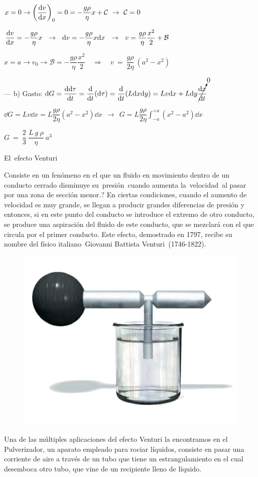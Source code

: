 $\displaystyle x=0 \to \left( \dv{v}{x} \right)_0=0 = -\dfrac{g\rho}{\eta} x + \mathcal C \ \to \  \mathcal C=0$

$\displaystyle \dv{v}{x}=-\dfrac{g\rho}{\eta} x \ \ \to \ \ \dd v = -\dfrac{g\rho}{\eta} x \dd x \ \ \to \ \ v=\dfrac{g \rho }{\eta}\dfrac{x^2}{2} +\mathcal B$

$x=a \to v_0 \to \mathcal B=-\dfrac{g \rho }{\eta}\dfrac{x^2}{2} \quad \Rightarrow \quad v\ =\ \dfrac{g\rho}{2\eta} \ (a^2-x^2)$

--- b) Gasto:  $\dd G=\displaystyle \dv{\dd \tau}{t}=\dv{t} (\dd \tau) = \dv{t} (L\dd x \dd y)=Lv\dd x + L \dd y \cancelto{0}{\dv{x}{t}}$

$\displaystyle \dd G= L v \dd x =L \dfrac{g\rho}{2\eta} (a^2-x^2) \dd x\ \ \to \ \ G=L \dfrac{g\rho}{2\eta} \int_{-a}^{+a} (x^2-a^2) \dd x$

$G\ =\ \dfrac 2 3 \ \dfrac{L \ g \ \rho}{\eta} \ a^3$
\newpage
\begin{myblock}{El efecto Venturi}

Consiste en un fenómeno en el que un fluido en movimiento dentro de un conducto cerrado disminuye su presión cuando aumenta la velocidad al pasar por una zona de sección menor.? En ciertas condiciones, cuando el aumento de velocidad es muy grande, se llegan a producir grandes diferencias de presión y entonces, si en este punto del conducto se introduce el extremo de otro conducto, se produce una aspiración del fluido de este conducto, que se mezclará con el que circula por el primer conducto. Este efecto, demostrado en 1797, recibe su nombre del físico italiano Giovanni Battista Venturi (1746-1822).

\begin{figure}[H]
	\centering
	\includegraphics[width=.75\textwidth]{imagenes/imagenes18/T18IM10.png}
	\end{figure}

Una de las múltiples aplicaciones  del efecto Venturi la encontramos en el Pulverizador, un aparato empleado para rociar líquidos, consiste en pasar una corriente de aire a través de un tubo que tiene un estrangulamiento en el cual desemboca otro tubo, que vine de un recipiente lleno de líquido.	
\end{myblock}
